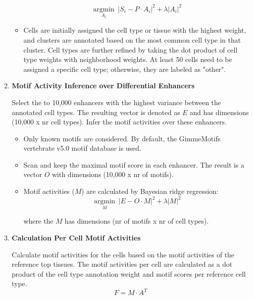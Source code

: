 \begin{enumerate}
\begin{itemize}
        \begin{equation*}
            \underset{A_i}{\operatorname{argmin}}\ |S_i - P \cdot A_i|^2 + \lambda |A_i|^2
        \end{equation*}
        
        \item Cells are initially assigned the cell type or tissue with the highest weight, and clusters are annotated based on the most common cell type in that cluster. Cell types are further refined by taking the dot product of cell type weights with neighborhood weights. At least 50 cells need to be assigned a specific cell type; otherwise, they are labeled as "other".
    \end{itemize}

    \item \textbf{Motif Activity Inference over Differential Enhancers}
    
    Select the to 10,000 enhancers with the highest variance between the annotated cell types. The resulting vector is denoted as $E$ and has dimensions (10,000 x nr cell types). Infer the motif activities over these enhancers. 
    
    \begin{itemize}
        \item Only known motifs are considered. By default, the GimmeMotifs\cite{Bruse_2018} vertebrate v5.0 motif database is used.
        \item Scan and keep the maximal motif score in each enhancer. The result is a vector $O$ with dimensions (10,000 x nr of motifs).
        \item Motif activities ($M$) are calculated by Bayesian ridge regression:
        \begin{equation*}
            \underset{M}{\operatorname{argmin}}\ |E - O \cdot M|^2 + \lambda |M|^2
        \end{equation*}

        where the $M$ has dimensions (nr of motifs x nr of cell types).
    \end{itemize}

    \item \textbf{Calculation Per Cell Motif Activities}
    
    Calculate motif activities for the cells based on the motif activities of the reference top tissues. The motif activities per cell are calculated as a dot product of the cell type annotation weight and motif scores per reference cell type.
    \begin{equation*}
        F = M \cdot A^T
    \end{equation*}


\end{enumerate}
